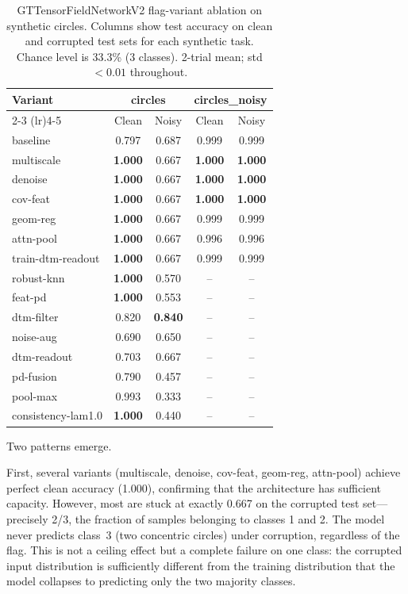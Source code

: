 \documentclass[a4paper,11pt]{article}
\begin{document}
\begin{table}[ht]
\centering
\caption{GTTensorFieldNetworkV2 flag-variant ablation on synthetic circles. Columns show test accuracy on clean and corrupted test sets for each synthetic task. Chance level is 33.3\% (3 classes). 2-trial mean; std $<0.01$ throughout.}
\label{tab:shape_ablation}
\small
\begin{tabular}{lcccc}
\toprule
Variant & \multicolumn{2}{c}{circles} & \multicolumn{2}{c}{circles\_noisy} \\
\cmidrule(lr){2-3} \cmidrule(lr){4-5}
 & Clean & Noisy & Clean & Noisy \\
\midrule
baseline         & 0.797 & 0.687 & 0.999 & 0.999 \\
multiscale       & \textbf{1.000} & 0.667 & \textbf{1.000} & \textbf{1.000} \\
denoise          & \textbf{1.000} & 0.667 & \textbf{1.000} & \textbf{1.000} \\
cov-feat         & \textbf{1.000} & 0.667 & \textbf{1.000} & \textbf{1.000} \\
geom-reg         & \textbf{1.000} & 0.667 & 0.999 & 0.999 \\
attn-pool        & \textbf{1.000} & 0.667 & 0.996 & 0.996 \\
train-dtm-readout & \textbf{1.000} & 0.667 & 0.999 & 0.999 \\
robust-knn       & \textbf{1.000} & 0.570 & -- & -- \\
feat-pd          & \textbf{1.000} & 0.553 & -- & -- \\
dtm-filter       & 0.820 & \textbf{0.840} & -- & -- \\
noise-aug        & 0.690 & 0.650 & -- & -- \\
dtm-readout      & 0.703 & 0.667 & -- & -- \\
pd-fusion        & 0.790 & 0.457 & -- & -- \\
pool-max         & 0.993 & 0.333 & -- & -- \\
consistency-lam1.0 & \textbf{1.000} & 0.440 & -- & -- \\
\bottomrule
\end{tabular}
\end{table}

Two patterns emerge.

First, several variants (multiscale, denoise, cov-feat, geom-reg, attn-pool) achieve perfect clean accuracy (1.000), confirming that the architecture has sufficient capacity.
However, most are stuck at exactly 0.667 on the corrupted test set---precisely 2/3, the fraction of samples belonging to classes 1 and 2.
The model never predicts class~3 (two concentric circles) under corruption, regardless of the flag.
This is not a ceiling effect but a complete failure on one class: the corrupted input distribution is sufficiently different from the training distribution that the model collapses to predicting only the two majority classes.
\end{document}
